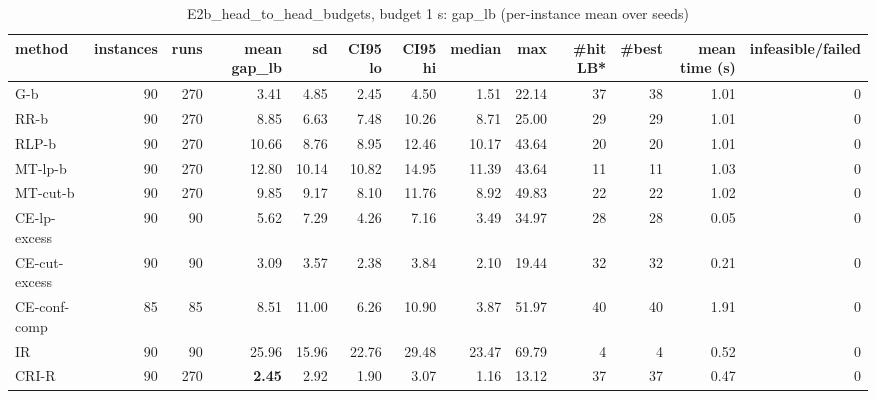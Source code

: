 \begin{table}[htbp]
\centering
\small
\caption{E2b\_head\_to\_head\_budgets, budget 1 s: gap\_lb (per-instance mean over seeds)}
\label{tab:E2b_head_to_head_budgets_b1_summary}
\begin{tabular}{lrrrrrrrrrrrr}
\toprule
method & instances & runs & mean gap\_lb & sd & CI95 lo & CI95 hi & median & max & \#hit LB* & \#best & mean time (s) & infeasible/failed \\
\midrule
G-b & 90 & 270 & 3.41 & 4.85 & 2.45 & 4.50 & 1.51 & 22.14 & 37 & 38 & 1.01 & 0 \\
RR-b & 90 & 270 & 8.85 & 6.63 & 7.48 & 10.26 & 8.71 & 25.00 & 29 & 29 & 1.01 & 0 \\
RLP-b & 90 & 270 & 10.66 & 8.76 & 8.95 & 12.46 & 10.17 & 43.64 & 20 & 20 & 1.01 & 0 \\
MT-lp-b & 90 & 270 & 12.80 & 10.14 & 10.82 & 14.95 & 11.39 & 43.64 & 11 & 11 & 1.03 & 0 \\
MT-cut-b & 90 & 270 & 9.85 & 9.17 & 8.10 & 11.76 & 8.92 & 49.83 & 22 & 22 & 1.02 & 0 \\
CE-lp-excess & 90 & 90 & 5.62 & 7.29 & 4.26 & 7.16 & 3.49 & 34.97 & 28 & 28 & 0.05 & 0 \\
CE-cut-excess & 90 & 90 & 3.09 & 3.57 & 2.38 & 3.84 & 2.10 & 19.44 & 32 & 32 & 0.21 & 0 \\
CE-conf-comp & 85 & 85 & 8.51 & 11.00 & 6.26 & 10.90 & 3.87 & 51.97 & 40 & 40 & 1.91 & 0 \\
IR & 90 & 90 & 25.96 & 15.96 & 22.76 & 29.48 & 23.47 & 69.79 & 4 & 4 & 0.52 & 0 \\
CRI-R & 90 & 270 & \textbf{2.45} & 2.92 & 1.90 & 3.07 & 1.16 & 13.12 & 37 & 37 & 0.47 & 0 \\
\bottomrule
\end{tabular}
\end{table}
